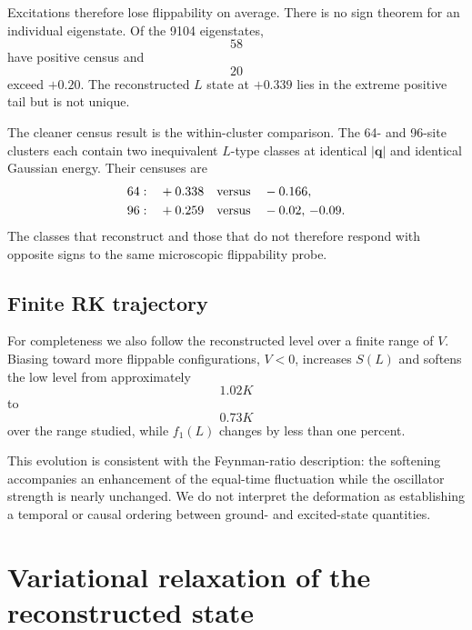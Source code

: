 \documentclass[
aps,
prl,
onecolumn,
amsmath,
amssymb,
superscriptaddress,
longbibliography
]{revtex4-2}
\newcommand{\bq}{\bm q}
\begin{document}
Excitations therefore lose flippability on average.
There is no sign theorem for an individual eigenstate.
Of the 9104 eigenstates,
\begin{equation}
58
\end{equation}
have positive census and
\begin{equation}
20
\end{equation}
exceed $+0.20$.
The reconstructed $L$ state at $+0.339$ lies in the extreme positive
tail but is not unique.

The cleaner census result is the within-cluster comparison.
The 64- and 96-site clusters each contain two inequivalent $L$-type
classes at identical $|\bq|$ and identical Gaussian energy.
Their censuses are
\begin{align}
64:\quad&
+0.338
\quad{\rm versus}\quad
-0.166,\\
96:\quad&
+0.259
\quad{\rm versus}\quad
-0.02,\,-0.09 .
\end{align}
The classes that reconstruct and those that do not therefore respond
with opposite signs to the same microscopic flippability probe.

\subsection{Finite RK trajectory}

For completeness we also follow the reconstructed level over a finite
range of $V$.
Biasing toward more flippable configurations, $V<0$, increases
$S(L)$ and softens the low level from approximately
\begin{equation}
1.02K
\end{equation}
to
\begin{equation}
0.73K
\end{equation}
over the range studied, while $f_1(L)$ changes by less than one
percent.

This evolution is consistent with the Feynman-ratio description:
the softening accompanies an enhancement of the equal-time
fluctuation while the oscillator strength is nearly unchanged.
We do not interpret the deformation as establishing a temporal or
causal ordering between ground- and excited-state quantities.

\section{Variational relaxation of the reconstructed state}
\label{sec:variational}
\end{document}
